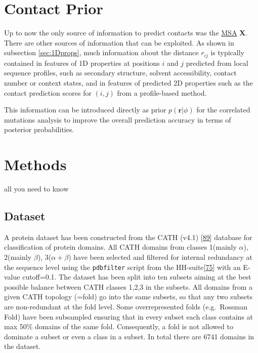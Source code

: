 \documentclass[12pt,a4paper,twoside]{book}
\renewcommand{\r}{\mathbf{r}}
\newcommand{\rij}{r_{ij}}
\newcommand{\X}{\mathbf{X}}
\theoremstyle{definition}
\theoremstyle{definition}
\theoremstyle{remark}
\begin{document}
\chapter{Contact Prior}\label{contact-prior}

Up to now the only source of information to predict contacts was the
\protect\hyperlink{abbrev}{MSA} \(\X\). There are other sources of
information that can be exploited. As shown in subsection
\ref{sec:1Dprops}, much information about the distance \(\rij\) is
typically contained in features of 1D properties at positions \(i\) and
\(j\) predicted from local sequence profiles, such as secondary
structure, solvent accessibility, contact number or context states, and
in features of predicted 2D properties such as the contact prediction
scores for \((i,j)\) from a profile-based method.

This information can be introduced directly as prior \(p(\r |\phi)\) for
the correlated mutations analysis to improve the overall prediction
accuracy in terms of posterior probabilities.

\chapter{Methods}\label{methods}

all you need to know

\section{Dataset}\label{dataset}

A protein dataset has been constructed from the CATH (v4.1)
{[}\protect\hyperlink{ref-Sillitoe2015}{89}{]} database for
classification of protein domains. All CATH domains from classes
1(mainly \(\alpha\)), 2(mainly \(\beta\)), 3(\(\alpha+\beta\)) have been
selected and filtered for internal redundancy at the sequence level
using the \texttt{pdbfilter} script from the
HH-suite{[}\protect\hyperlink{ref-Remmert2012}{75}{]} with an E-value
cutoff=0.1. The dataset has been split into ten subsets aiming at the
best possible balance between CATH classes 1,2,3 in the subsets. All
domains from a given CATH topology (=fold) go into the same subsets, so
that any two subsets are non-redundant at the fold level. Some
overrepresented folds (e.g.~Rossman Fold) have been subsampled ensuring
that in every subset each class contains at max 50\% domains of the same
fold. Consequently, a fold is not allowed to dominate a subset or even a
class in a subset. In total there are 6741 domains in the dataset.
\end{document}
